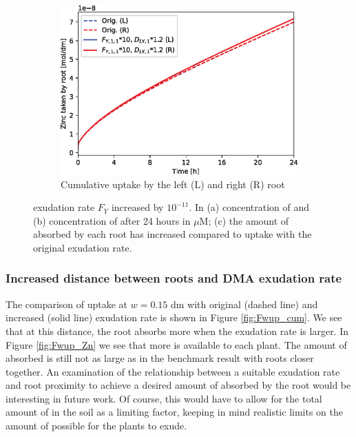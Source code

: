 \documentclass[11pt]{article}
\numberwithin{equation}{section}
\begin{document}
\begin{figure}[h]
\begin{subfigure}[t]{0.31\textwidth}
     \caption{}
     \label{fig:Fup_Zn}
     \end{subfigure}
     \begin{subfigure}[t]{0.37\textwidth}
    \includegraphics[width=\textwidth]{Figures/testpics/ZnCumulative/IncreasedDMACumuZn.eps}
    \caption{Cumulative  uptake by the left (L) and right (R) root}
    \label{fig:Fup_cum}
    \end{subfigure}
    \caption{ exudation rate $F_Y$ increased by $10^{-11}$. In (a) concentration of  and (b) concentration of  after 24 hours in $\mu$M; (c) the amount of  absorbed by each root has increased compared to uptake with the original exudation rate.}
\end{figure}


\subsubsection{Increased distance between roots and DMA exudation rate}
The comparison of  uptake at $w=0.15$ \si{dm} with original (dashed line) and increased (solid line) exudation rate is shown in Figure \ref{fig:Fwup_cum}. We see that at this distance, the root absorbs more  when the exudation rate is larger. 
In Figure \ref{fig:Fwup_Zn} we see that more  is available to each plant. The amount of  absorbed is still not as large as in the benchmark result with roots closer together. An examination of the relationship between a suitable exudation rate and root proximity to achieve a desired amount of  absorbed by the root would be interesting in future work.
Of course, this would have to allow for the total amount of  in the soil as a limiting factor, keeping in mind realistic limits on the amount of  possible for the plants to exude. 
\end{document}
